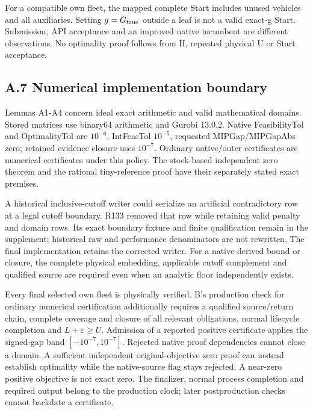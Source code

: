 \documentclass[
  american,
  11pt,
]{article}
\begin{document}
For a compatible own fleet, the mapped complete Start includes unused
vehicles and all auxiliaries. Setting \(g=G_{\rm true}\) outside a leaf
is not a valid exact-g Start. Submission, API acceptance and an improved
native incumbent are different observations. No optimality proof follows
from H, repeated physical U or Start acceptance.

\subsection{A.7 Numerical implementation
boundary}\label{a.7-numerical-implementation-boundary}

Lemmas A1-A4 concern ideal exact arithmetic and valid mathematical
domains. Stored matrices use binary64 arithmetic and Gurobi 13.0.2.
Native FeasibilityTol and OptimalityTol are \(10^{-6}\), IntFeasTol
\(10^{-5}\), requested MIPGap/MIPGapAbs zero; retained evidence closure
uses \(10^{-7}\). Ordinary native/outer certificates are numerical
certificates under this policy. The stock-based independent zero theorem
and the rational tiny-reference proof have their separately stated exact
premises.

A historical inclusive-cutoff writer could serialize an artificial
contradictory row at a legal cutoff boundary. R133 removed that row
while retaining valid penalty and domain rows. Its exact boundary
fixture and finite qualification remain in the supplement; historical
raw and performance denominators are not rewritten. The final
implementation retains the corrected writer. For a native-derived bound
or closure, the complete physical embedding, applicable cutoff
complement and qualified source are required even when an analytic floor
independently exists.

Every final selected own fleet is physically verified. B's production
check for ordinary numerical certification additionally requires a
qualified source/return chain, complete coverage and closure of all
relevant obligations, normal lifecycle completion and
\(L+\varepsilon\ge U\). Admission of a reported positive certificate
applies the signed-gap band \([-10^{-7},10^{-7}]\). Rejected native
proof dependencies cannot close a domain. A sufficient independent
original-objective zero proof can instead establish optimality while the
native-source flag stays rejected. A near-zero positive objective is not
exact zero. The finalizer, normal process completion and required output
belong to the production clock; later postproduction checks cannot
backdate a certificate.
\end{document}
